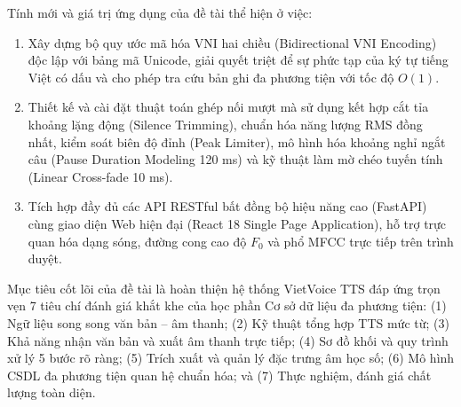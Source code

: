 Tính mới và giá trị ứng dụng của đề tài thể hiện ở việc:
\begin{enumerate}
    \item Xây dựng bộ quy ước mã hóa VNI hai chiều (Bidirectional VNI Encoding) độc lập với bảng mã Unicode, giải quyết triệt để sự phức tạp của ký tự tiếng Việt có dấu và cho phép tra cứu bản ghi đa phương tiện với tốc độ $O(1)$.
    \item Thiết kế và cài đặt thuật toán ghép nối mượt mà sử dụng kết hợp cắt tỉa khoảng lặng động (Silence Trimming), chuẩn hóa năng lượng RMS đồng nhất, kiểm soát biên độ đỉnh (Peak Limiter), mô hình hóa khoảng nghỉ ngắt câu (Pause Duration Modeling 120 ms) và kỹ thuật làm mờ chéo tuyến tính (Linear Cross-fade 10 ms).
    \item Tích hợp đầy đủ các API RESTful bất đồng bộ hiệu năng cao (FastAPI) cùng giao diện Web hiện đại (React 18 Single Page Application), hỗ trợ trực quan hóa dạng sóng, đường cong cao độ $F_0$ và phổ MFCC trực tiếp trên trình duyệt.
\end{enumerate}

Mục tiêu cốt lõi của đề tài là hoàn thiện hệ thống VietVoice TTS đáp ứng trọn vẹn 7 tiêu chí đánh giá khắt khe của học phần Cơ sở dữ liệu đa phương tiện: (1) Ngữ liệu song song văn bản -- âm thanh; (2) Kỹ thuật tổng hợp TTS mức từ; (3) Khả năng nhận văn bản và xuất âm thanh trực tiếp; (4) Sơ đồ khối và quy trình xử lý 5 bước rõ ràng; (5) Trích xuất và quản lý đặc trưng âm học số; (6) Mô hình CSDL đa phương tiện quan hệ chuẩn hóa; và (7) Thực nghiệm, đánh giá chất lượng toàn diện.

